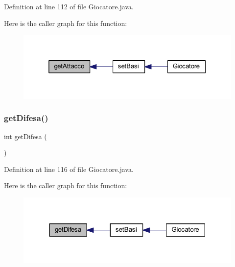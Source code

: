 Definition at line 112 of file Giocatore.\+java.

Here is the caller graph for this function\+:
\nopagebreak
\begin{figure}[H]
\begin{center}
\leavevmode
\includegraphics[width=325pt]{class_entita_1_1_giocatore_aafeab2e7e3b0e536c594b5aef8c31683_icgraph}
\end{center}
\end{figure}
\mbox{\label{class_entita_1_1_giocatore_a5cd7986fb28ad7739710f90e464b1b27}} 
\subsubsection{\texorpdfstring{get\+Difesa()}{getDifesa()}}
{\footnotesize\ttfamily int get\+Difesa (\begin{DoxyParamCaption}{ }\end{DoxyParamCaption})}



Definition at line 116 of file Giocatore.\+java.

Here is the caller graph for this function\+:
\nopagebreak
\begin{figure}[H]
\begin{center}
\leavevmode
\includegraphics[width=318pt]{class_entita_1_1_giocatore_a5cd7986fb28ad7739710f90e464b1b27_icgraph}
\end{center}
\end{figure}
\mbox{\label{class_entita_1_1_giocatore_acc1691c076ed9335796eac421dce845f}} 
